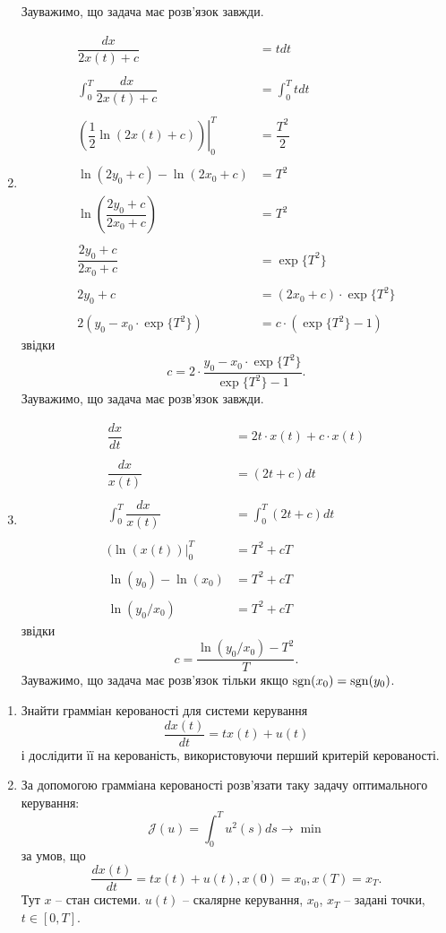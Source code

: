 \begin{solution}
\begin{enumerate}
Зауважимо, що задача має розв'язок завжди.
\item 
\begin{align*}
    \dfrac{dx}{2x(t) + c} &= t dt \\
    \\
    \int_0^T \dfrac{dx}{2x(t) + c} &= \int_0^T t dt \\
    \\
    \left.\left(\dfrac 12 \ln(2x(t) + c)\right)\right|_0^T &= \dfrac {T^2} 2 \\
    \\
    \ln(2y_0 + c) - \ln(2x_0 + c) &= T^2 \\
    \\
    \ln\left(\dfrac{2y_0 + c}{2x_0 + c}\right) &= T^2 \\
    \\
    \dfrac{2y_0 + c}{2x_0 + c} &= \exp\{T^2\} \\
    \\
    2y_0 + c &= (2x_0 + c)\cdot \exp\{T^2\} \\
    \\
    2(y_0 - x_0 \cdot \exp\{T^2\}) &= c \cdot (\exp\{T^2\} - 1) 
\end{align*}
звідки
\[c = 2\cdot \dfrac{y_0 - x_0 \cdot \exp\{T^2\}}{\exp\{T^2\} - 1}. \]
Зауважимо, що задача має розв'язок завжди.
\item 
\begin{align*}
    \dfrac{dx}{dt} &= 2t\cdot x(t) + c\cdot x(t) \\
    \\
    \dfrac{dx}{x(t)} &= (2t + c) dt \\
    \\
    \int_0^T \dfrac{dx}{x(t)} &= \int_0^T (2t + c) dt \\
    \\
    (\ln(x(t))|_0^T &= T^2 + cT \\
    \\
    \ln(y_0) - \ln(x_0) &= T^2 + cT \\ 
    \\
    \ln\left(y_0/x_0\right) &= T^2 + cT 
\end{align*}
звідки
\[ c = \dfrac{\ln\left(y_0/x_0\right) - T^2}{T}. \]
Зауважимо, що задача має розв'язок тільки якщо $\operatorname{sgn}(x_0) = \operatorname{sgn}(y_0)$.
\end{enumerate}
\end{solution} 

\begin{problem}
\begin{enumerate}
    \item Знайти грамміан керованості для системи керування \[\dfrac{dx(t)}{dt} = tx(t) + u(t)\] і дослідити її на керованість, використовуючи перший критерій керованості.
    \item За допомогою грамміана керованості розв'язати таку задачу оптимального керування: \[\mathcal{J}(u) = \int_0^T u^2(s) ds \to \min\]
    за умов, що \[\dfrac{dx(t)}{dt} = tx(t) + u(t), x(0) = x_0, x(T) = x_T. \]
    Тут $x$ -- стан системи. $u(t)$ -- скалярне керування, $x_0$, $x_T$ -- задані точки, $t\in[0,T]$.
\end{enumerate}
\end{problem}

